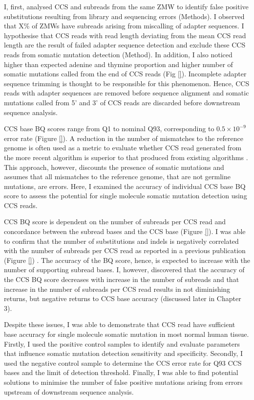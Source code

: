 I, first, analysed CCS and subreads from the same ZMW to identify false positive substitutions resulting from library and sequencing errors (Methods). I observed that X\% of ZMWs have subreads arising from miscalling of adapter sequences. I hypothesise that CCS reads with read length deviating from the mean CCS read length are the result of failed adapter sequence detection and exclude these CCS reads from somatic mutation detection (Method). In addition, I also noticed higher than expected adenine and thymine proportion and higher number of somatic mutations called from the end of CCS reads (Fig \ref{}). Incomplete adapter sequence trimming is thought to be responsible for this phenomenon. Hence, CCS reads with adapter sequences are removed before sequence alignment and somatic mutations called from 5’ and 3’ of CCS reads are discarded before downstream sequence analysis. 

CCS base BQ scores range from Q1 to nominal Q93, corresponding to $0.5\times10^{-9}$ error rate (Figure \ref{}). A reduction in the number of mismatches to the reference genome is often used as a metric to evaluate whether CCS read generated from the more recent algorithm is superior to that produced from existing algorithms \cite{Wenger2019-pw, Baid2022-or}. This approach, however, discounts the presence of somatic mutations and assumes that all mismatches to the reference genome, that are not germline mutations, are errors. Here, I examined the accuracy of individual CCS base BQ score to assess the potential for single molecule somatic mutation detection using CCS reads.   

CCS BQ score is dependent on the number of subreads per CCS read and concordance between the subread bases and the CCS base (Figure \ref{}). I was able to confirm that the number of substitutions and indels is negatively correlated with the number of subreads per CCS read as reported in a previous publication (Figure \ref{}) \cite{Wenger2019-pw}. The accuracy of the BQ score, hence, is expected to increase with the number of supporting subread bases. I, however, discovered that the accuracy of the CCS BQ score decreases with increase in the number of subreads and that increase in the number of subreads per CCS read results in not diminishing returns, but negative returns to CCS base accuracy (discussed later in Chapter 3). 

Despite these issues, I was able to demonstrate that CCS read have sufficient base accuracy for single molecule somatic mutation in most normal human tissue. Firstly, I used the positive control samples to identify and evaluate parameters that influence somatic mutation detection sensitivity and specificity. Secondly, I used the negative control sample to determine the CCS error rate for Q93 CCS bases and the limit of detection threshold. Finally, I was able to find potential solutions to minimise the number of false positive mutations arising from errors upstream of downstream sequence analysis. 


